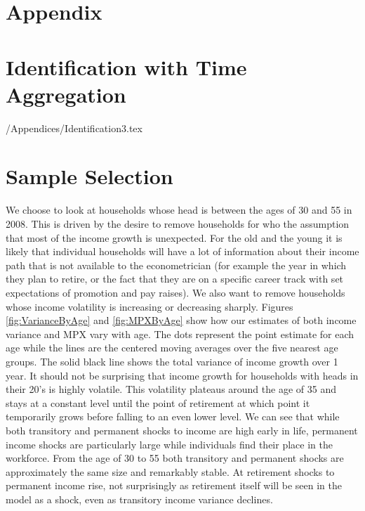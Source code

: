 \documentclass[titlepage]{\econtex}\newcommand{\texname}{ConsumptionHeterogeneity}
\begin{document}
\processdelayedfloats

\small

\normalsize

\pagebreak
\appendix

\section*{Appendix}

\section{Identification with Time Aggregation}\label{sec:Identification}

\econtexRoot/Appendices/Identification3.tex


\section{Sample Selection} \label{sample_selection}
We choose to look at households whose head is between the ages of 30 and 55 in 2008. This is driven by the desire to remove households for who the assumption that most of the income growth is unexpected. For the old and the young it is likely that individual households will have a lot of information about their income path that is not available to the econometrician (for example the year in which they plan to retire, or the fact that they are on a specific career track with set expectations of promotion and pay raises). We also want to remove households whose income volatility is increasing or decreasing sharply. Figures \ref{fig:VarianceByAge} and \ref{fig:MPXByAge} show how our estimates of both income variance and MPX vary with age. The dots represent the point estimate for each age while the lines are the centered moving averages over the five nearest age groups. The solid black line shows the total variance of income growth over 1 year. It should not be surprising that income growth for households with heads in their 20's is highly volatile. This volatility plateaus around the age of 35 and stays at a constant level until the point of retirement at which point it temporarily grows before falling to an even lower level. We can see that while both transitory and permanent shocks to income are high early in life, permanent income shocks are particularly large while individuals find their place in the workforce. From the age of 30 to 55 both transitory and permanent shocks are approximately the same size and remarkably stable. At retirement shocks to permanent income rise, not surprisingly as retirement itself will be seen in the model as a shock, even as transitory income variance declines.
\end{document}
